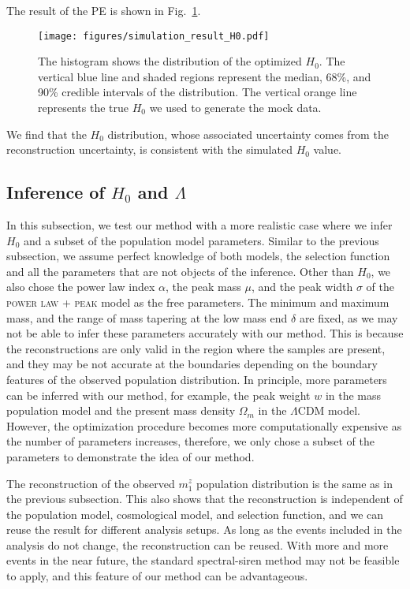 \documentclass[sn-aps, pdflatex]{sn-jnl}
\begin{document}
The result of the \ac{PE} is shown in Fig.~\ref{fig:simulation_result_H0}.
\begin{figure}[htbp]
    \texttt{[image: figures/simulation\_result\_H0.pdf]}
    \caption{
        The histogram shows the distribution of the optimized $H_0$.
        The vertical blue line and shaded regions represent the median, 68\%, and 90\% credible intervals of the distribution.
        The vertical orange line represents the true $H_0$ we used to generate the mock data.
    }
    \label{fig:simulation_result_H0}
\end{figure}
We find that the $H_0$ distribution, whose associated uncertainty comes from the reconstruction uncertainty, is consistent with the simulated $H_0$ value.

\subsection{Inference of $H_0$ and $\Lambda$}
\label{sec:inference_multi}

In this subsection, we test our method with a more realistic case where we infer $H_0$ and a subset of the population model parameters.
Similar to the previous subsection, we assume perfect knowledge of both models, the selection function and all the parameters that are not objects of the inference.
Other than $H_0$, we also chose the power law index $\alpha$, the peak mass $\mu$, and the peak width $\sigma$ of the \textsc{power law + peak} model as the free parameters.
The minimum and maximum mass, and the range of mass tapering at the low mass end $\delta$ are fixed, as we may not be able to infer these parameters accurately with our method.
This is because the reconstructions are only valid in the region where the samples are present, and they may be not accurate at the boundaries depending on the boundary features of the observed population distribution.
In principle, more parameters can be inferred with our method, for example, the peak weight $w$ in the mass population model and the present mass density $\Omega_m$ in the $\Lambda$CDM model.
However, the optimization procedure becomes more computationally expensive as the number of parameters increases, therefore, we only chose a subset of the parameters to demonstrate the idea of our method.

The reconstruction of the observed $m^z_1$ population distribution is the same as in the previous subsection.
This also shows that the reconstruction is independent of the population model, cosmological model, and selection function, and we can reuse the result for different analysis setups.
As long as the events included in the analysis do not change, the reconstruction can be reused.
With more and more events in the near future, the standard spectral-siren method may not be feasible to apply, and this feature of our method can be advantageous.
\end{document}
